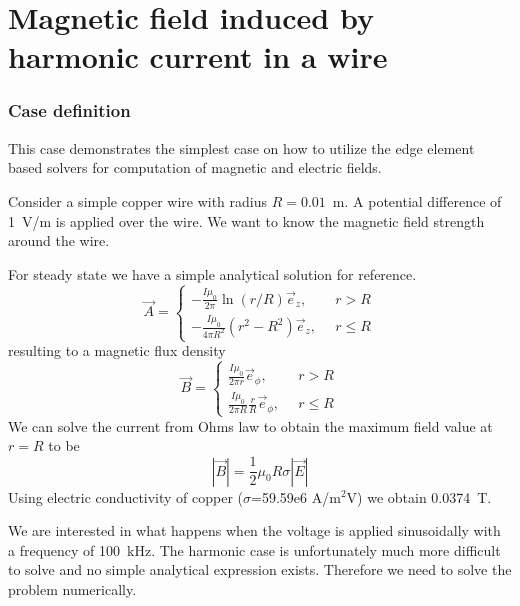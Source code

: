 \chapter{Magnetic field induced by harmonic current in a wire}



\subsection*{Case definition}

This case demonstrates the simplest case on how to utilize the edge element based solvers
for computation of magnetic and electric fields.

Consider a simple copper wire with radius $R=0.01$~m. A potential difference of 1~V/m is applied
over the wire. We want to know the magnetic field strength around the wire.  

For steady state we have a simple analytical solution for reference.
\begin{equation}
\vec{A} = \left \{
\begin{array}{ll}
  -\frac{I\mu_0}{2\pi}\ln (r/R) \vec{e}_z, & \, \, \, r > R \\
  -\frac{I\mu_0}{4\pi R^2 } (r^2 - R^2) \vec{e}_z, & \, \, \, r \leq R 
\end{array}  
\right .
\end{equation}
resulting to a magnetic flux density
\begin{equation}
\vec{B} = \left \{
\begin{array}{ll}
  \frac{I\mu_0}{2\pi r}\vec{e}_\phi, & \, \, \, r > R \\
  \frac{I\mu_0}{2\pi R}\frac{r}{R}\vec{e}_\phi, & \, \, \, r \leq R 
\end{array}  
\right .
\end{equation}
We can solve the current from Ohms law to obtain the maximum field value at $r=R$ to be
\begin{equation}
  | \vec{B} | = \frac{1}{2} \mu_0 R \sigma | \vec{E} |   
\end{equation}
Using electric conductivity of copper ($\sigma$=59.59e6 A/m$^2$V) we obtain 0.0374~T.

We are interested in what happens when the voltage is applied sinusoidally with a frequency of 100~kHz.
The harmonic case is unfortunately much more difficult to solve and no simple analytical expression exists.
Therefore we need to solve the problem numerically. 


